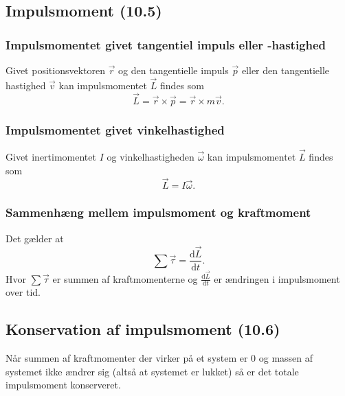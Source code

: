 \subsection{Impulsmoment (10.5)}

\subsubsection{Impulsmomentet givet tangentiel impuls eller -hastighed} \label{afs:impmomtanimp}
Givet positionsvektoren $\Vec{r}$ og den tangentielle impuls $\Vec{p}$ eller den tangentielle hastighed $\Vec{v}$ kan impulsmomentet $\Vec{L}$ findes som
\[ 
\Vec{L} = \Vec{r} \times \Vec{p} = \Vec{r} \times m \Vec{v}
.\]

\subsubsection{Impulsmomentet givet vinkelhastighed} \label{afs:impmomvinhas}
Givet inertimomentet $I$ og vinkelhastigheden $\Vec{\omega}$ kan impulsmomentet $\Vec{L}$ findes som
\[ 
\Vec{L} = I \Vec{\omega}
.\]


\subsubsection{Sammenhæng mellem impulsmoment og kraftmoment}
Det gælder at
\[ 
\sum \Vec{\tau} = \frac{\mathrm{d}\Vec{L}}{\mathrm{d}t} 
.\]
Hvor $\sum \Vec{\tau}$ er summen af kraftmomenterne og $\frac{\mathrm{d}\Vec{L}}{\mathrm{d}t}$ er ændringen i impulsmoment over tid.


\subsection{Konservation af impulsmoment (10.6)}
Når summen af kraftmomenter der virker på et system er 0 og massen af systemet ikke ændrer sig (altså at systemet er lukket) så er det totale impulsmoment konserveret.
